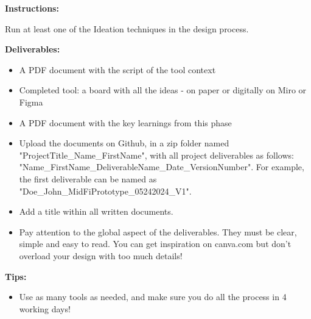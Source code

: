 \makeheaderfiles

\textbf{Instructions:}

Run at least one of the Ideation techniques in the design process.

\textbf{Deliverables:}

\begin{itemize}
\item A PDF document with the script of the tool context
\item Completed tool: a board with all the ideas - on paper or digitally on Miro or Figma
\item A PDF document with the key learnings from this phase
\item Upload the documents on Github, in a zip folder named "ProjectTitle\_Name\_FirstName", with all project deliverables as follows: "Name\_FirstName\_DeliverableName\_Date\_VersionNumber".  For example, the first deliverable can be named as "Doe\_John\_MidFiPrototype\_05242024\_V1".
\item Add a title within all written documents.
\item Pay attention to the global aspect of the deliverables. They must be clear, simple and easy to read. You can get inspiration on canva.com but don't overload your design with too much details!
\end{itemize}

\textbf{Tips:}

\begin{itemize}
\item Use as many tools as needed, and make sure you do all the process in 4 working days!
\end{itemize}

